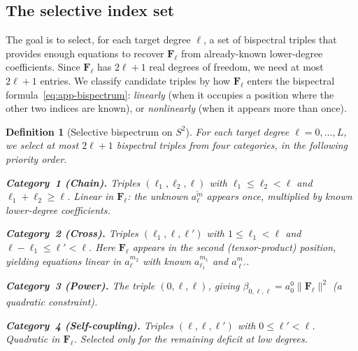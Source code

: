 \documentclass{article}
\newtheorem{definition}[theorem]{Definition}
\newcommand{\norm}[1]{\lVert #1 \rVert}
\newcommand{\conj}[1]{\overline{#1}}
\begin{document}
\subsection{The selective index set}

The goal is to select, for each target degree $\ell$, a set of
bispectral triples that provides enough equations to recover
$\mathbf{F}_\ell$ from already-known lower-degree coefficients. Since
$\mathbf{F}_\ell$ has $2\ell+1$ real degrees of freedom, we need at
most $2\ell+1$ entries. We classify candidate triples by how
$\mathbf{F}_\ell$ enters the bispectral formula~\eqref{eq:app-bispectrum}:
\emph{linearly} (when it occupies a position where the other two
indices are known), or \emph{nonlinearly} (when it appears more than
once).

\begin{definition}[Selective bispectrum on $S^2$]\label{def:app-selective}
For each target degree $\ell = 0, \dotsc, L$, we select at most
$2\ell+1$ bispectral triples from four categories, in the following
priority order.

\medskip
\noindent\textbf{Category~1 (Chain).}
Triples $(\ell_1, \ell_2, \ell)$ with
$\ell_1 \le \ell_2 < \ell$ and $\ell_1 + \ell_2 \ge \ell$.
Linear in $\mathbf{F}_\ell$: the unknown
$\conj{a_\ell^m}$ appears once, multiplied by known lower-degree
coefficients.

\medskip
\noindent\textbf{Category~2 (Cross).}
Triples $(\ell_1, \ell, \ell')$ with
$1 \le \ell_1 < \ell$ and $\ell - \ell_1 \le \ell' < \ell$.
Here $\mathbf{F}_\ell$ appears in the second (tensor-product) position,
yielding equations linear in $a_\ell^{m_2}$ with known $a_{\ell_1}^{m_1}$
and $a_{\ell'}^{m}$.

\medskip
\noindent\textbf{Category~3 (Power).}
The triple $(0, \ell, \ell)$, giving
$\beta_{0,\ell,\ell} = a_0^0 \norm{\mathbf{F}_\ell}^2$
(a \emph{quadratic} constraint).

\medskip
\noindent\textbf{Category~4 (Self-coupling).}
Triples $(\ell, \ell, \ell')$ with $0 \le \ell' < \ell$.
Quadratic in $\mathbf{F}_\ell$. Selected only for the remaining deficit
at low degrees.
\end{definition}
\end{document}
